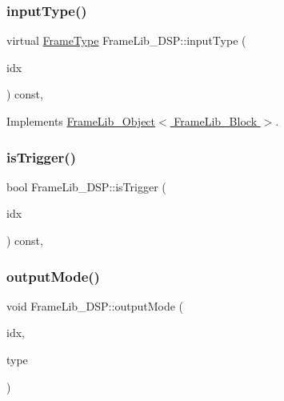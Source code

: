 \mbox{\label{class_frame_lib___d_s_p_a774197b0f41e1f78671fab6112a41ed9}} 
\subsubsection{\texorpdfstring{input\+Type()}{inputType()}}
{\footnotesize\ttfamily virtual \hyperlink{_frame_lib___types_8h_ad495a9f61af7fff07d7e97979d1ab854}{Frame\+Type} Frame\+Lib\+\_\+\+D\+S\+P\+::input\+Type (\begin{DoxyParamCaption}\item[{unsigned long}]{idx }\end{DoxyParamCaption}) const\hspace{0.3cm}{\ttfamily [inline]}, {\ttfamily [virtual]}}



Implements \hyperlink{class_frame_lib___object_ab1ab1ae8180bb8b7e881aac6a4e1066c}{Frame\+Lib\+\_\+\+Object$<$ Frame\+Lib\+\_\+\+Block $>$}.

\mbox{\label{class_frame_lib___d_s_p_a13e269a66e0b9fb40ead089530e49eaa}} 
\subsubsection{\texorpdfstring{is\+Trigger()}{isTrigger()}}
{\footnotesize\ttfamily bool Frame\+Lib\+\_\+\+D\+S\+P\+::is\+Trigger (\begin{DoxyParamCaption}\item[{unsigned long}]{idx }\end{DoxyParamCaption}) const\hspace{0.3cm}{\ttfamily [inline]}, {\ttfamily [protected]}}

\mbox{\label{class_frame_lib___d_s_p_a82ba080c4038eede7bae208555df1780}} 
\subsubsection{\texorpdfstring{output\+Mode()}{outputMode()}}
{\footnotesize\ttfamily void Frame\+Lib\+\_\+\+D\+S\+P\+::output\+Mode (\begin{DoxyParamCaption}\item[{unsigned long}]{idx,  }\item[{\hyperlink{_frame_lib___types_8h_ad495a9f61af7fff07d7e97979d1ab854}{Frame\+Type}}]{type }\end{DoxyParamCaption})\hspace{0.3cm}{\ttfamily [protected]}}

